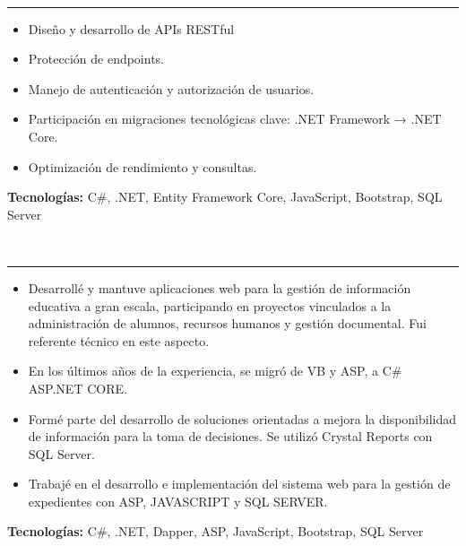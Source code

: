 \documentclass[10pt,a4paper]{article}
\begin{document}
\vspace{3pt}

\\[-3pt]
{\rule{\textwidth}{0.25pt}}
\begin{itemize}
    \item Diseño y desarrollo de APIs RESTful
    \item Protección de endpoints.
    \item Manejo de autenticación y autorización de usuarios.
    \item Participación en migraciones tecnológicas clave: .NET Framework → .NET Core.
    \item Optimización de rendimiento y consultas.
\end{itemize}
\vspace{2pt}
{\small \textbf{Tecnologías:} C\#, .NET, Entity Framework Core, JavaScript, Bootstrap, SQL Server}

\vspace{3pt}

\\[-3pt]
{\rule{\textwidth}{0.25pt}}
\begin{itemize}
    \item Desarrollé y mantuve aplicaciones web para la gestión de información educativa a gran escala, participando en proyectos vinculados a la administración de alumnos, recursos humanos y gestión documental. Fui referente técnico en este aspecto.
    \item En los últimos años de la experiencia, se migró de VB y ASP, a C\# ASP.NET CORE.
    \item Formé parte del desarrollo de soluciones orientadas a mejora la disponibilidad de información para la toma de decisiones. Se utilizó Crystal Reports con SQL Server.
    \item Trabajé en el desarrollo e implementación del sistema web para la gestión de expedientes con ASP, JAVASCRIPT y SQL SERVER.
\end{itemize}
\vspace{2pt}
{\small \textbf{Tecnologías:} C\#, .NET, Dapper, ASP, JavaScript, Bootstrap, SQL Server}

\vspace{3pt}
\end{document}
